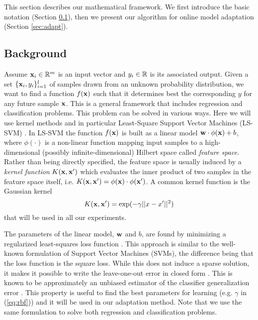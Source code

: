 This section describes our mathematical framework. We first introduce
the basic notation (Section \ref{sec:back}), then we present our algorithm
for online model adaptation (Section \ref{sec:adapt}).

\subsection{Background}
\label{sec:back}

Assume $\mathbf{x}_i \in \mathbb{R}^m$ is an input vector and $y_i \in \mathbb{R}$ is its
associated output.  Given a set $\{\mathbf{x}_i,y_i\}_{i=1}^l$ of samples
drawn from an unknown probability distribution, we want to find a
function $f(\mathbf{x})$ such that it determines best
the corresponding 
$y$ for any future sample $\mathbf{x}$.
This is a general framework that includes regression and
classification problems.  This problem can be solved in various
ways. Here we will use kernel methods and in particular Least-Square
Support Vector Machines (LS-SVM) \cite{Cristianini00}. In LS-SVM the
function $f(\mathbf{x})$ is built as a linear model $\mathbf{w} \cdot \phi(\mathbf{x}) +
b$, where $\phi(\cdot)$ is a non-linear function mapping input samples
to a high-dimensional (possibly infinite-dimensional) Hilbert space
called \emph{feature space}. Rather than being directly specified, the
feature space is usually induced by a \emph{kernel function}
$K(\mathbf{x},\mathbf{x}')$ which evaluates the inner product of two samples in the
feature space itself,
i.e. $K(\mathbf{x},\mathbf{x}')=\phi(\mathbf{x}) \cdot \phi(\mathbf{x}')$. A common kernel
function is the Gaussian kernel
\begin{equation}
  K(\mathbf{x},\mathbf{x}')=\exp(-\gamma ||x-x'||^2)
  \label{eq:rbf}
\end{equation}
\noindent that will be used in all our experiments.

The parameters of the linear model, $\mathbf{w}$ and $b$, are found by
minimizing a regularized least-squares loss function
\cite{Cristianini00}. This approach is similar to the well-known
formulation of Support Vector Machines (SVMs), the difference being
that the loss function is the square loss.
While this does not induce a sparse solution,
it makes it possible to write the leave-one-out error in closed form
\cite{Rifkin07}. This is known to be approximately an unbiased
estimator of the classifier generalization error \cite{LuntzB69}. This
property is useful to find the best parameters for learning
(e.g. $\gamma$ in (\ref{eq:rbf})) and it will be used in our
adaptation method. Note that we use the same formulation to solve both
regression and classification problems.

